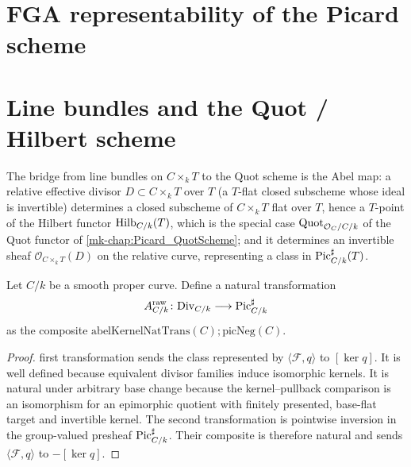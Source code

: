 \section{FGA representability of the Picard scheme}
\label{mk-sec:fga_pic_setup}
\label{mk-chap:Picard_FGAPicRepresentability}

\section{Line bundles and the Quot / Hilbert scheme}
\label{mk-sec:fga_pic_line_bundle_quot}

The bridge from line bundles on \(C \times_k T\) to the Quot scheme is the
Abel map: a relative effective divisor \(D \subset C \times_k T\) over \(T\)
(a \(T\)-flat closed subscheme whose ideal is invertible) determines a closed
subscheme of \(C \times_k T\) flat over \(T\), hence a \(T\)-point of the Hilbert
functor \(\operatorname{Hilb}_{C/k}(T)\), which is the special case \(\operatorname{Quot}_{\mathcal{O}_C/C/k}\)
of the Quot functor of \ref{mk-chap:Picard_QuotScheme}; and it determines an
invertible sheaf \(\mathcal{O}_{C \times_k T}(D)\) on the relative curve,
representing a class in \(\operatorname{Pic}^\sharp_{C/k}(T)\).

\begin{definition}\label{mk-def:abel_map_witness}
  \leanok

  Let \(C/k\) be a smooth proper curve. Define a
  natural transformation
  \[
    A^{\mathrm{raw}}_{C/k} \colon \mathrm{Div}_{C/k}
      \longrightarrow \operatorname{Pic}^\sharp_{C/k}
  \]
  as the composite
  \(
    \mathrm{abelKernelNatTrans}(C)
    \mathbin{;} \mathrm{picNeg}(C)
  \).
\end{definition}

\begin{proof}
  \leanokThe first transformation sends the class represented by
  \(\langle \mathcal F,q\rangle\) to \([\ker q]\). It is well defined because
  equivalent divisor families induce isomorphic kernels. It is natural under
  arbitrary base change because the kernel--pullback comparison is an
  isomorphism for an epimorphic quotient with finitely presented, base-flat
  target and invertible kernel. The second transformation is pointwise
  inversion in the group-valued presheaf \(\operatorname{Pic}^\sharp_{C/k}\). Their composite
  is therefore natural and sends
  \(\langle \mathcal F,q\rangle\) to \(-[\ker q]\).
\end{proof}

